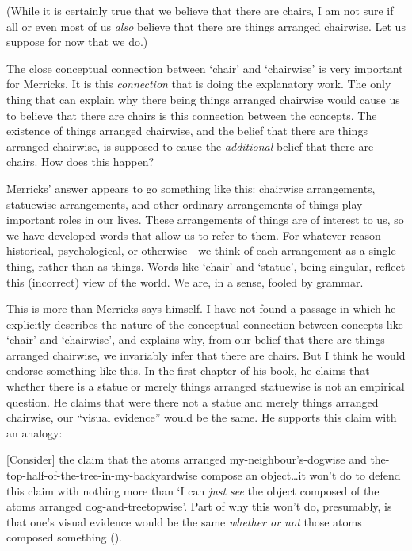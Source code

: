 \documentclass[11pt]{article}
\newenvironment{squote}{%
\begin{spacing}{1}
       	\begin{list}{}{%
\setlength{\labelwidth}{0pt}%
\rightmargin\leftmargin%
}
\item\relax
}{%
\end{list}%
\end{spacing}
}
\begin{document}
\begin{spacing}{1.25}
(While it is certainly true that we believe that there are chairs, I
am not sure if all or even most of us {\em also} believe that there
are things arranged chairwise.  Let us suppose for now that we do.)

The close conceptual connection between `chair' and `chairwise' is
very important for Merricks.  It is this {\em connection} that is
doing the explanatory work.  The only thing that can explain why there
being things arranged chairwise would cause us to believe that there
are chairs is this connection between the concepts.  The existence of
things arranged chairwise, and the belief that there are things
arranged chairwise, is supposed to cause the {\em additional} belief
that there are chairs.  How does this happen?

Merricks' answer appears to go something like this: chairwise
arrangements, statuewise arrangements, and other ordinary arrangements
of things play important roles in our lives.  These arrangements of
things are of interest to us, so we have developed words that allow us
to refer to them.  For whatever reason---historical, psychological, or
otherwise---we think of each arrangement as a single thing, rather
than as things.  Words like `chair' and `statue', being singular,
reflect this (incorrect) view of the world.  We are, in a sense,
fooled by grammar.

This is more than Merricks says himself.  I have not found a passage
in which he explicitly describes the nature of the conceptual
connection between concepts like `chair' and `chairwise', and explains
why, from our belief that there are things arranged chairwise, we
invariably infer that there are chairs.  But I think he would endorse
something like this.  In the first chapter of his book, he claims that
whether there is a statue or merely things arranged statuewise is not
an empirical question.  He claims that were there not a statue and
merely things arranged chairwise, our ``visual evidence'' would be the
same.  He supports this claim with an analogy:

\begin{squote}
{[}Consider{]} the claim that the atoms arranged
my-neighbour's-dogwise and the-top-half-of-the-tree-in-my-backyardwise
compose an object\ldots it won't do to defend this claim with nothing
more than `I can \emph{just see} the object composed of the atoms
arranged dog-and-treetopwise'. Part of why this won't do, presumably,
is that one's visual evidence would be the same \emph{whether or not}
those atoms composed something (\citeyear[8--9]{merricks2001a}).
\end{squote}


\end{spacing}
\end{document}
